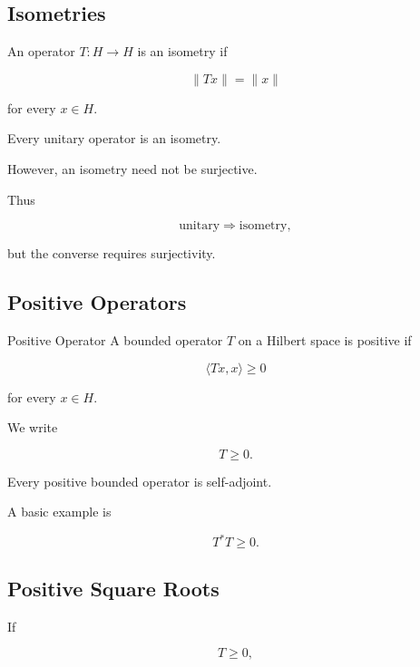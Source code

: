 \subsection{Isometries}
\label{subsec:isometries-operators}

An operator \(T:H\to H\) is an isometry if

\[
\boxed{
\|Tx\|=\|x\|
}
\]

for every \(x\in H\).

Every unitary operator is an isometry.

However, an isometry need not be surjective.

Thus

\[
\boxed{
\text{unitary}
\Longrightarrow
\text{isometry},
}
\]

but the converse requires surjectivity.

\subsection{Positive Operators}
\label{subsec:positive-operators}

\begin{definitionbox}{Positive Operator}
A bounded operator \(T\) on a Hilbert space is positive if

\[
\boxed{
\langle Tx,x\rangle
\geq0
}
\]

for every \(x\in H\).
\end{definitionbox}

We write

\[
\boxed{
T\geq0.
}
\]

Every positive bounded operator is self-adjoint.

A basic example is

\[
\boxed{
T^*T\geq0.
}
\]

\subsection{Positive Square Roots}
\label{subsec:positive-square-roots}

If

\[
T\geq0,
\]


